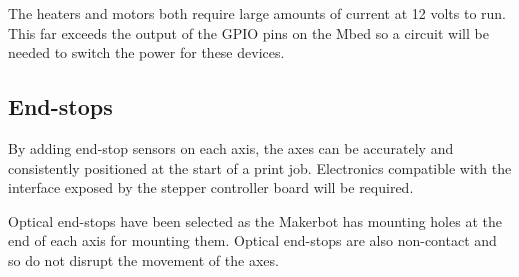 			The heaters and motors both require large amounts of current at 12 volts
			to run. This far exceeds the output of the GPIO pins on the Mbed so a
			circuit will be needed to switch the power for these devices.
			
		
		\subsection{End-stops}
			
			By adding end-stop sensors on each axis, the axes can be accurately and
			consistently positioned at the start of a print job. Electronics
			compatible with the interface exposed by the stepper controller board will
			be required.
			
			Optical end-stops have been selected as the Makerbot has mounting holes at
			the end of each axis for mounting them.  Optical end-stops are also
			non-contact and so do not disrupt the movement of the axes.
			
